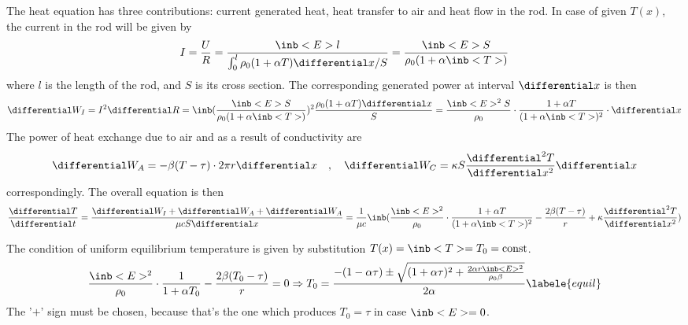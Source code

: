 The heat equation has three contributions: current generated heat,
heat transfer to air and heat flow in the rod.
In case of given $T(x)$, the current in the rod will be given by
\begin{equation}
    I = \frac{U}{R} = \frac{\inb<E>l}{\int_0^l
    \rho_0 (1+\alpha T) \differential x / S} =
    \frac{\inb<E>S}{\rho_0(1+\alpha \inb<T>)}
\end{equation}
where $l$ is the length of the rod, and $S$ is its cross section.
The corresponding generated power at interval $\differential x$ is then
\begin{equation}
    \differential W_I = I^2 \differential R =
    \inb({\frac{\inb<E>S}{\rho_0(1+\alpha \inb<T>)}})^2
    \frac{\rho_0(1+\alpha T)\differential x}{S}=
    \frac{\inb<E>^2 S}{\rho_0} \cdot
    \frac{1+\alpha T}{(1+\alpha \inb<T>)^2} \cdot \differential x
\end{equation}
The power of heat exchange due to air and as a result of conductivity are
\begin{equation}
    \differential W_A = -\beta (T-\tau) \cdot 2\pi r \differential x 
    \quad , \quad 
    \differential W_C = \kappa S \frac{\differential^2 T}{\differential x^2} \differential x
\end{equation}
correspondingly. The overall equation is then
\begin{equation}
    \frac{\differential T}{\differential t} =
    \frac{\differential W_I + \differential W_A + \differential W_A}
    {\mu c S \differential x}=\frac{1}{\mu c}\inb({
        \frac{\inb<E>^2}{\rho_0} \cdot
        \frac{1+\alpha T}{(1+\alpha \inb<T>)^2} -
        \frac{2\beta (T-\tau)}{r} +
        \kappa \frac{\differential^2 T}{\differential x^2}
    })
\end{equation}

The condition of uniform equilibrium temperature is given by substitution
$T(x)=\inb<T>=T_0=\text{const}$.
\begin{equation}
    \frac{\inb<E>^2}{\rho_0} \cdot
    \frac{1}{1+\alpha T_0} -
    \frac{2\beta (T_0-\tau)}{r} = 0 \Rightarrow
    T_0 = \frac{-(1-\alpha \tau) \pm \sqrt{(1+\alpha \tau)^2 +
    \frac{2 \alpha r \inb<E>^2}{\rho_0 \beta}}}{2 \alpha}
    \labele{equil}
\end{equation}
The '$+$' sign must be chosen, because that's the one which produces
$T_0 = \tau$ in case $\inb<E>=0$.

